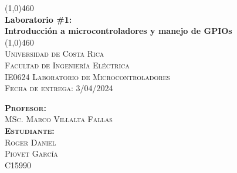 \begin{titlepage}    
    \begin{center}
        \line(1,0){460}\\
        [5mm]
        \huge{\bfseries Laboratorio \#1:\\ Introducción a microcontroladores y manejo de GPIOs}\\
        \line(1,0){460}\\
        [2.5cm]
        \textsc{\Large Universidad de Costa Rica\\Facultad de Ingeniería Eléctrica\\IE0624 Laboratorio de Microcontroladores}\\
        \textsc{\Large Fecha de entrega: 3/04/2024}\\
        \vspace{2.5cm}
        \begin{flushleft}
            \textsc{\large 
            \textbf{Profesor:}\\ MSc. Marco Villalta Fallas\\[2mm]
            \textbf{Estudiante:}\\ Roger Daniel\\Piovet García\\[2mm]C15990\\}
        \end{flushleft}
    \end{center}
\end{titlepage}
\restoregeometry
